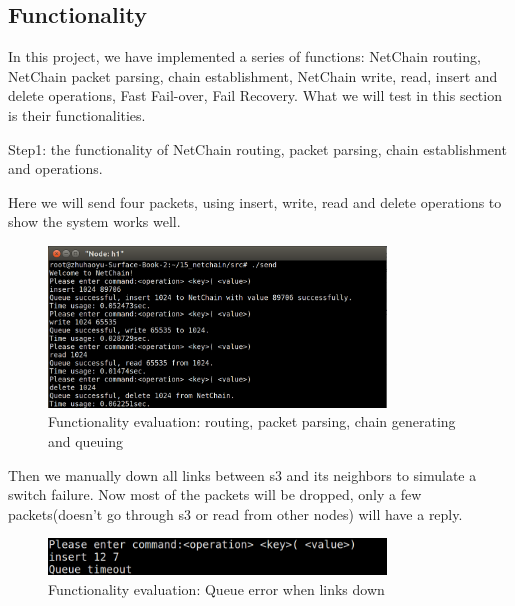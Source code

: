 \documentclass[11pt,oneside,a4paper]{article}
\begin{document}
\subsection{Functionality}

In this project, we have implemented a series of functions: NetChain routing, NetChain packet parsing, chain establishment, NetChain write, read, insert and delete operations, Fast Fail-over, Fail Recovery. What we will test in this section is their functionalities. 

Step1: the functionality of NetChain routing, packet parsing, chain establishment and operations.

Here we will send four packets, using insert, write, read and delete operations to show the system works well.

\begin{figure}[h]
    \centering
    \includegraphics[width=0.8\textwidth]{figures/Evaluation_func_1.png}
    
    \caption{Functionality evaluation: routing, packet parsing, chain generating and queuing}
    \label{fig:Eva_func_1}
\end{figure}



Then we manually down all links between s3 and its neighbors to simulate a switch failure. Now most of the packets will be dropped, only a few packets(doesn't go through s3 or read from other nodes) will have a reply.

\begin{figure}[h]
    \centering
    \includegraphics[width=0.8\textwidth]{figures/Evaluation_func_fail.png}
    
    \caption{Functionality evaluation: Queue error when links down}
    \label{fig:Eva_func_fail}
\end{figure}
\end{document}
